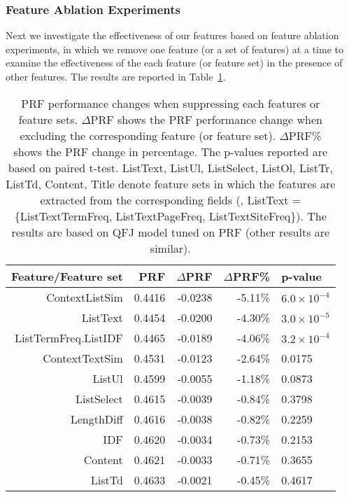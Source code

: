 \subsubsection{Feature Ablation Experiments}
Next we investigate the effectiveness of our features based on feature ablation experiments, in which we remove one feature (or a set of features) at a time to examine the effectiveness of the each feature (or feature set) in the presence of other features. The results are reported in Table~\ref{tab:intrinsic-ablation}.
\begin{table}[!htbp]
\centering
\caption{PRF performance changes when suppressing each features or feature sets. $\Delta$PRF shows the PRF performance change when excluding the corresponding feature (or feature set). $\Delta$PRF\% shows the PRF change in percentage. The p-values reported are based on paired t-test. ListText, ListUl, ListSelect, ListOl, ListTr, ListTd, Content, Title denote feature sets in which the features are extracted from the corresponding fields (\eg, ListText = \{ListTextTermFreq, ListTextPageFreq, ListTextSiteFreq\}). 
The results are based on QFJ model tuned on PRF (other results are similar).}
\label{tab:intrinsic-ablation}
\begin{tabular}{|r|r|r|r|l|} \hline
Feature/Feature set & PRF & $\Delta$PRF & $\Delta$PRF\% & p-value\\ \hline
ContextListSim & 0.4416 & -0.0238 & -5.11\% & $6.0\times10^{-4}$ \\ \hline
ListText & 0.4454 & -0.0200 & -4.30\% & $3.0\times10^{-5}$ \\ \hline
ListTermFreq.ListIDF & 0.4465 & -0.0189 & -4.06\% & $3.2\times10^{-4}$ \\ \hline
ContextTextSim & 0.4531 & -0.0123 & -2.64\% & 0.0175 \\ \hline
ListUl & 0.4599 & -0.0055 & -1.18\% & 0.0873 \\ \hline
ListSelect & 0.4615 & -0.0039 & -0.84\% & 0.3798 \\ \hline
LengthDiff & 0.4616 & -0.0038 & -0.82\% & 0.2259 \\ \hline
IDF & 0.4620 & -0.0034 & -0.73\% & 0.2153 \\ \hline
Content & 0.4621 & -0.0033 & -0.71\% & 0.3655 \\ \hline
ListTd & 0.4633 & -0.0021 & -0.45\% & 0.4617 \\ \hline

\end{tabular}
\end{table}
